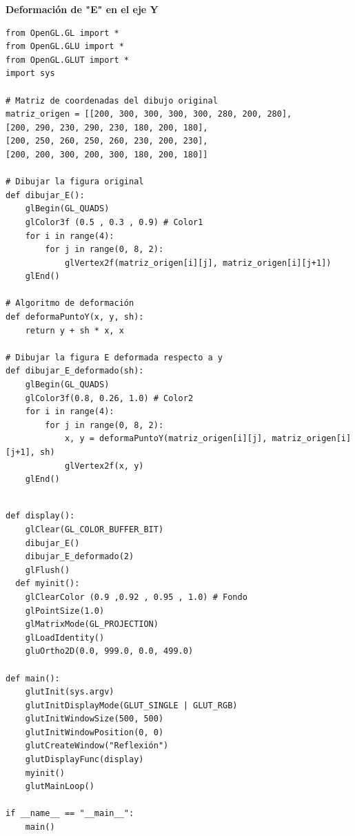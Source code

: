 \documentclass[a4paper]{article}
\begin{document}
\Large{\textbf{Deformación de "E" en el eje Y}}\\[-0.4cm]
\begin{center}
\begin{mycodeboxl}
\begin{lstlisting}
from OpenGL.GL import *
from OpenGL.GLU import *
from OpenGL.GLUT import *
import sys
 
# Matriz de coordenadas del dibujo original
matriz_origen = [[200, 300, 300, 300, 300, 280, 200, 280],
[200, 290, 230, 290, 230, 180, 200, 180],
[200, 250, 260, 250, 260, 230, 200, 230],
[200, 200, 300, 200, 300, 180, 200, 180]]
 
# Dibujar la figura original
def dibujar_E():
    glBegin(GL_QUADS)
    glColor3f (0.5 , 0.3 , 0.9) # Color1
    for i in range(4):
        for j in range(0, 8, 2):
            glVertex2f(matriz_origen[i][j], matriz_origen[i][j+1])
    glEnd()
 
# Algoritmo de deformación
def deformaPuntoY(x, y, sh):
    return y + sh * x, x
 
# Dibujar la figura E deformada respecto a y
def dibujar_E_deformado(sh):
    glBegin(GL_QUADS)
    glColor3f(0.8, 0.26, 1.0) # Color2
    for i in range(4):
        for j in range(0, 8, 2):
            x, y = deformaPuntoY(matriz_origen[i][j], matriz_origen[i][j+1], sh)
            glVertex2f(x, y)
    glEnd()
\end{lstlisting}
\end{mycodeboxl}
\end{center}
\newpage
\begin{center}
\begin{mycodebox}
\begin{lstlisting}
 
def display():
    glClear(GL_COLOR_BUFFER_BIT)
    dibujar_E()
    dibujar_E_deformado(2)
    glFlush()
  def myinit():
    glClearColor (0.9 ,0.92 , 0.95 , 1.0) # Fondo
    glPointSize(1.0) 
    glMatrixMode(GL_PROJECTION)
    glLoadIdentity()
    gluOrtho2D(0.0, 999.0, 0.0, 499.0)
 
def main():
    glutInit(sys.argv)
    glutInitDisplayMode(GLUT_SINGLE | GLUT_RGB)
    glutInitWindowSize(500, 500) 
    glutInitWindowPosition(0, 0)
    glutCreateWindow("Reflexión") 
    glutDisplayFunc(display)
    myinit() 
    glutMainLoop()
 
if __name__ == "__main__":
    main()
\end{lstlisting}
\end{mycodebox}
\end{center}
\end{document}
